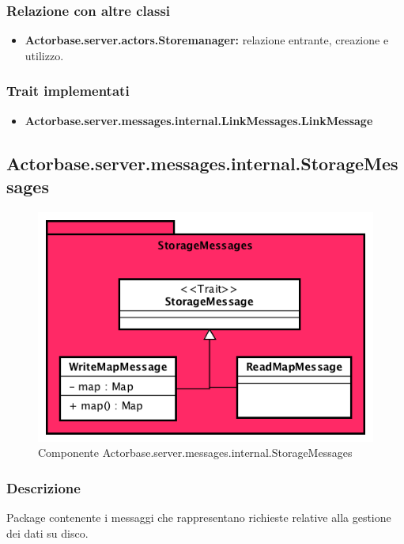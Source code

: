 \documentclass[a4paper]{article}
\begin{document}
			\subsubsection{Relazione con altre classi}
				\begin{itemize}
					\item \textbf{Actorbase.server.actors.Storemanager:} relazione entrante, creazione e utilizzo.
				\end{itemize}
				
			\subsubsection{Trait implementati}
				\begin{itemize}
					\item \textbf{Actorbase.server.messages.internal.LinkMessages.LinkMessage} 
				\end{itemize}

\subsection{Actorbase.server.messages.internal.StorageMessages}		

			\begin{figure} [H]
				\centering
				\includegraphics[scale = 0.6]{ST/Server/StorageMessages.png}
				\caption{Componente Actorbase.server.messages.internal.StorageMessages}
			\end{figure}
			\subsubsection{Descrizione}
				Package contenente i messaggi che rappresentano richieste relative alla gestione dei dati su disco.
				
\end{document}
